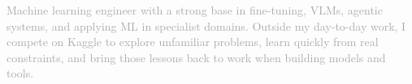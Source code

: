 

\textcolor{darkgray}{Machine learning engineer with a strong base in fine-tuning, VLMs, agentic systems, and applying ML in specialist domains. Outside my day-to-day work, I compete on Kaggle to explore unfamiliar problems, learn quickly from real constraints, and bring those lessons back to work when building models and tools.}
